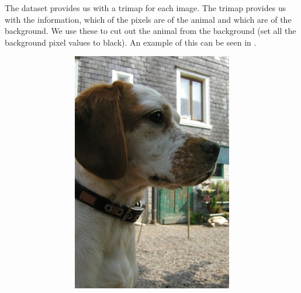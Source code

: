 The dataset provides us with a trimap for each image. The trimap provides us with the information, which of the pixels are of the animal and which are of the background. We use these to cut out the animal from the background (set all the background pixel values to black). An example of this can be seen in .
\begin{figure}[!htp]
    \centering
    \begin{subfigure}{0.5\textwidth}
        \begin{subfigure}[t]{0.45\textwidth}
            \includegraphics[width=\textwidth]{Figures/datasets/beagele.jpg}
            \label{fig:original:example}
        \end{subfigure}\hfill
        \begin{subfigure}[t]{0.45\textwidth}

\end{subfigure}
\end{subfigure}
\end{figure}
